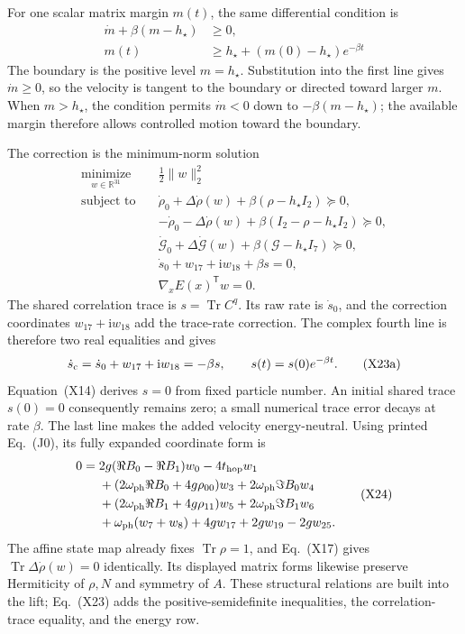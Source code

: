 \documentclass[10pt,letterpaper,twocolumn]{article}
\newcommand{\R}{\mathbb R}
\newcommand{\ii}{\mathrm i}
\begin{document}
For one scalar matrix margin \(m(t)\), the same differential condition is
\[
\begin{aligned}
\dot m+\beta(m-h_\star)&\geq0,\\
m(t)&\geq h_\star+(m(0)-h_\star)e^{-\beta t}
\end{aligned}
\tag{X22}
\]
The boundary is the positive level \(m=h_\star\).  Substitution into the first
line gives \(\dot m\geq0\), so the velocity is tangent to the boundary or
directed toward larger \(m\).  When \(m>h_\star\), the condition permits
\(\dot m<0\) down to \(-\beta(m-h_\star)\); the available margin therefore
allows controlled motion toward the boundary.

The correction is the minimum-norm solution
{\footnotesize
\[
\begin{aligned}
\underset{w\in\R^{31}}{\operatorname{minimize}}\quad
&\tfrac12\lVert w\rVert_2^2\\
\text{subject to}\quad
&\dot\rho_0+\Delta\dot\rho(w)
+\beta(\rho-h_\star I_2)\succeq0,\\
&-\dot\rho_0-\Delta\dot\rho(w)
+\beta(I_2-\rho-h_\star I_2)\succeq0,\\
&\dot{\mathcal G}_0+\Delta\dot{\mathcal G}(w)
+\beta(\mathcal G-h_\star I_7)\succeq0,\\
&\dot s_0+w_{17}+\ii w_{18}+\beta s=0,\\
&\nabla_xE(x)^{\mathsf T}w=0.
\end{aligned}
\tag{X23}
\]
}
The shared correlation trace is \(s=\operatorname{Tr}C^q\).  Its raw rate is
\(\dot s_0\), and the correction coordinates \(w_{17}+\ii w_{18}\) add the
trace-rate correction.  The complex fourth line is therefore two real
equalities and gives
\[
\dot s_{\rm c}=\dot s_0+w_{17}+\ii w_{18}=-\beta s,
\qquad
s(t)=s(0)e^{-\beta t}.
\tag{X23a}
\]
Equation~(X14) derives \(s=0\) from fixed particle number.  An initial shared
trace \(s(0)=0\) consequently remains zero; a small numerical trace error
decays at rate \(\beta\).  The last line makes the added velocity
energy-neutral.  Using printed Eq.~(J0), its fully expanded coordinate form is
{\scriptsize
\[
\begin{aligned}
0={}&2g(\Re B_0-\Re B_1)w_0-4t_{\rm hop}w_1\\
&+(2\omega_{\rm ph}\Re B_0+4g\rho_{00})w_3
+2\omega_{\rm ph}\Im B_0w_4\\
&+(2\omega_{\rm ph}\Re B_1+4g\rho_{11})w_5
+2\omega_{\rm ph}\Im B_1w_6\\
&+\omega_{\rm ph}(w_7+w_8)
+4gw_{17}+2gw_{19}-2gw_{25}.
\end{aligned}
\tag{X24}
\]
}
The affine state map already fixes \(\operatorname{Tr}\rho=1\), and
Eq.~(X17) gives \(\operatorname{Tr}\Delta\dot\rho(w)=0\) identically.  Its
displayed matrix forms likewise preserve Hermiticity of \(\rho,N\) and
symmetry of \(A\).  These structural relations are built into the lift;
Eq.~(X23) adds the positive-semidefinite inequalities, the correlation-trace
equality, and the energy row.
\end{document}
